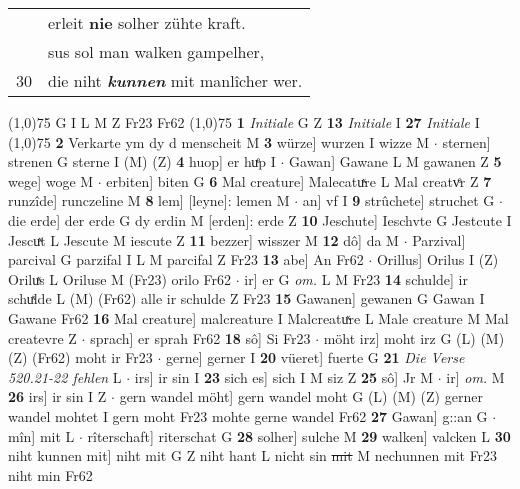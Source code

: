 \documentclass[8pt,a4paper,notitlepage]{article}
\begin{document}
\begin{table}[ht]
\begin{minipage}[t]{0.5\linewidth}
\begin{tabular}{rl}
 & erleit \textbf{nie} solher zühte kraft.\\ 
 & sus sol man walken gampelher,\\ 
30 & die niht \textit{\textbf{kunnen}} mit manlîcher wer.\\ 
\end{tabular}
\scriptsize
\line(1,0){75} \newline
G I L M Z Fr23 Fr62 \newline
\line(1,0){75} \newline
\textbf{1} \textit{Initiale} G Z  \textbf{13} \textit{Initiale} I  \textbf{27} \textit{Initiale} I  \newline
\line(1,0){75} \newline
\textbf{2} Verkarte ym dy d menscheit M \textbf{3} würze] wurzen I wizze M  $\cdot$ sternen] strenen G sterne I (M) (Z) \textbf{4} huop] er huͤp I  $\cdot$ Gawan] Gawane L M gawanen Z \textbf{5} wege] woge M  $\cdot$ erbiten] biten G \textbf{6} Mal creature] Malecatuͯre L Mal creatvͤr Z \textbf{7} runzîde] runczeline M \textbf{8} lem] [leyne]: lemen M  $\cdot$ an] vf I \textbf{9} strûchete] struchet G  $\cdot$ die erde] der erde G dy erdin M [erden]: erde Z \textbf{10} Jeschute] Ieschvte G Jestcute I Jescuͯt L Jescute M iescute Z \textbf{11} bezzer] wisszer M \textbf{12} dô] da M  $\cdot$ Parzival] parcival G parzifal I L M parcifal Z Fr23 \textbf{13} abe] An Fr62  $\cdot$ Orillus] Orilus I (Z) Oriluͯs L Oriluse M (Fr23) orilo Fr62  $\cdot$ ir] er G \textit{om.} L M Fr23 \textbf{14} schulde] ir schuͯlde L (M) (Fr62) alle ir schulde Z Fr23 \textbf{15} Gawanen] gewanen G Gawan I Gawane Fr62 \textbf{16} Mal creature] malcreature I Malcreatuͯre L Male creature M Mal createvre Z  $\cdot$ sprach] er sprah Fr62 \textbf{18} sô] Si Fr23  $\cdot$ möht irz] moht irz G (L) (M) (Z) (Fr62) moht ir Fr23  $\cdot$ gerne] gerner I \textbf{20} vüeret] fuerte G \textbf{21} \textit{Die Verse 520.21-22 fehlen} L   $\cdot$ irs] ir sin I \textbf{23} sich es] sich I M siz Z \textbf{25} sô] Jr M  $\cdot$ ir] \textit{om.} M \textbf{26} irs] ir sin I Z  $\cdot$ gern wandel möht] gern wandel moht G (L) (M) (Z) gerner wandel mohtet I gern moht Fr23 mohte gerne wandel Fr62 \textbf{27} Gawan] g::an G  $\cdot$ mîn] mit L  $\cdot$ rîterschaft] riterschat G \textbf{28} solher] sulche M \textbf{29} walken] valcken L \textbf{30} niht kunnen mit] niht mit G Z niht hant L nicht sin \sout{mit} M nechunnen mit Fr23 niht min Fr62 \newline
\end{minipage}
\hspace{0.5cm}

\end{table}
\end{document}
